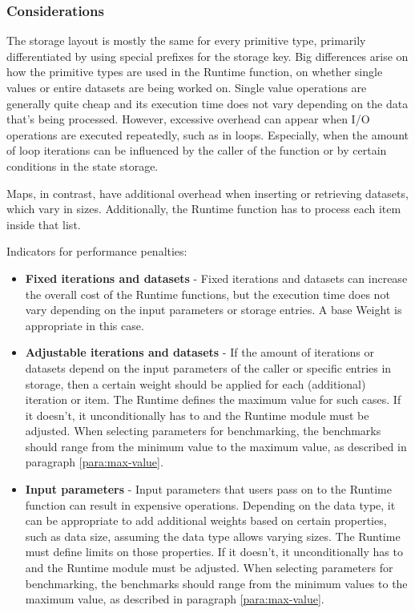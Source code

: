 \documentclass[11pt,a4paper]{article}
\begin{document}
\subsubsection{Considerations}\label{sect:primitive-types-considerations}

The storage layout is mostly the same for every primitive type, primarily
differentiated by using special prefixes for the storage key. Big differences
arise on how the primitive types are used in the Runtime function, on whether
single values or entire datasets are being worked on. Single value operations
are generally quite cheap and its execution time does not vary depending on the
data that's being processed. However, excessive overhead can appear when I/O
operations are executed repeatedly, such as in loops. Especially, when the amount
of loop iterations can be influenced by the caller of the function or by certain
conditions in the state storage.
\newline

Maps, in contrast, have additional overhead when inserting or retrieving
datasets, which vary in sizes. Additionally, the Runtime function has to process
each item inside that list.
\newline

Indicators for performance penalties:

\begin{itemize}
  \item \textbf{Fixed iterations and datasets} - Fixed iterations and datasets
  can increase the overall cost of the Runtime functions, but the execution time
  does not vary depending on the input parameters or storage entries. A base
  Weight is appropriate in this case.
  \item \textbf{Adjustable iterations and datasets} - If the amount of
  iterations or datasets depend on the input parameters of the caller or
  specific entries in storage, then a certain weight should be applied for each
  (additional) iteration or item. The Runtime defines the maximum value for such
  cases. If it doesn't, it unconditionally has to and the Runtime module must be
  adjusted. \newline\newline
  When selecting parameters for benchmarking, the benchmarks should range from
  the minimum value to the maximum value, as described in paragraph
  \ref{para:max-value}.
  \item \textbf{Input parameters} - Input parameters that users pass on to the
  Runtime function can result in expensive operations. Depending on the data
  type, it can be appropriate to add additional weights based on certain
  properties, such as data size, assuming the data type allows varying sizes.
  The Runtime must define limits on those properties. If it doesn't, it
  unconditionally has to and the Runtime module must be adjusted.
  \newline\newline
  When selecting parameters for benchmarking, the benchmarks should range from
  the minimum values to the maximum value, as described in paragraph
  \ref{para:max-value}.
\end{itemize}
\end{document}
